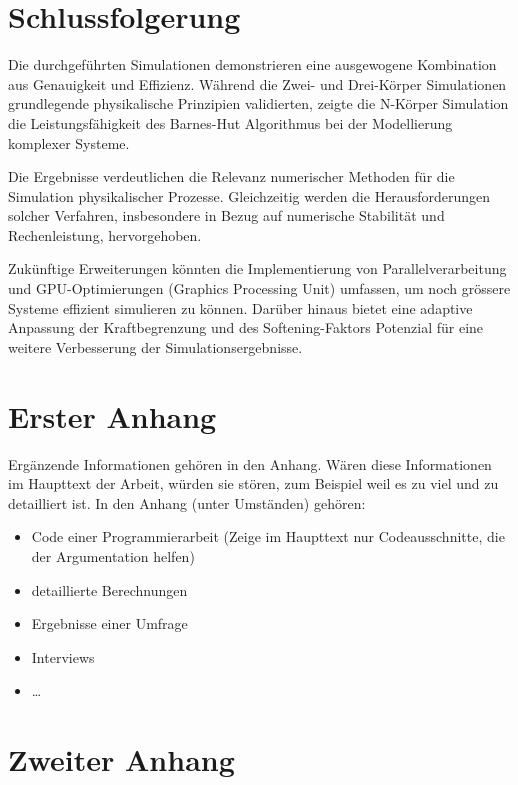 \documentclass[a4paper,12pt,twoside]{article}
\begin{document}
\section{Schlussfolgerung}
Die durchgeführten Simulationen demonstrieren eine ausgewogene Kombination aus Genauigkeit und Effizienz. Während die Zwei- und Drei-Körper Simulationen grundlegende physikalische Prinzipien validierten, zeigte die N-Körper Simulation die Leistungsfähigkeit des Barnes-Hut Algorithmus bei der Modellierung komplexer Systeme.

Die Ergebnisse verdeutlichen die Relevanz numerischer Methoden für die Simulation physikalischer Prozesse. Gleichzeitig werden die Herausforderungen solcher Verfahren, insbesondere in Bezug auf numerische Stabilität und Rechenleistung, hervorgehoben.

Zukünftige Erweiterungen könnten die Implementierung von Parallelverarbeitung und GPU-Optimierungen (Graphics Processing Unit) umfassen, um noch grössere Systeme effizient simulieren zu können. Darüber hinaus bietet eine adaptive Anpassung der Kraftbegrenzung und des Softening-Faktors Potenzial für eine weitere Verbesserung der Simulationsergebnisse.


\section{Erster Anhang}

Ergänzende Informationen gehören in den Anhang. Wären diese Informationen im Haupttext der Arbeit, würden sie stören, zum Beispiel weil es zu viel und zu detailliert ist. In den Anhang (unter Umständen) gehören:
\begin{itemize}
	\item Code einer Programmierarbeit (Zeige im Haupttext nur Codeausschnitte, die der Argumentation helfen)
	\item detaillierte Berechnungen
	\item Ergebnisse einer Umfrage
	\item Interviews
	\item \ldots
\end{itemize}


\newpage

\section{Zweiter Anhang}
\end{document}
